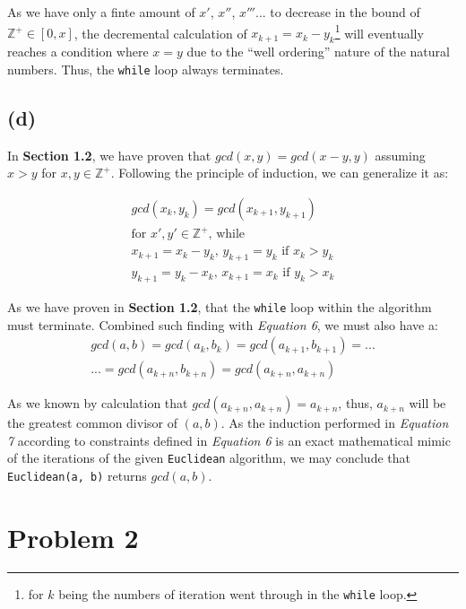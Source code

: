 \documentclass[12pt]{article}
\newcommand{\inlinecode}{\texttt}
\begin{document}
As we have only a finte amount of $x'$, $x''$, $x'''$... to decrease in the bound of $\mathbb{Z^+} \in [0, x]$, the decremental calculation of $x_{k+1} = x_{k} - y_{k}$\footnote{for $k$ being the numbers of iteration went through in the \inlinecode{while} loop.} will eventually reaches a condition where $x = y$ due to the ``well ordering'' nature of the natural numbers. Thus, the \inlinecode{while} loop always terminates.

\subsection{(d)}

In \textbf{Section 1.2}, we have proven that $gcd(x, y) = gcd(x-y, y)$ assuming $x > y$ for $x, y \in \mathbb{Z^+}$. Following the principle of induction, we can generalize it as:

\begin{gather}
    gcd(x_k, y_k) = gcd(x_{k+1}, y_{k+1}) \\
    \text{for $x', y' \in \mathbb{Z^+}$,  while } \nonumber \\
    \text{$x_{k+1} = x_{k} - y_{k}$, $y_{k+1} = y_{k}$ \ \ \  if $x_{k} > y_{k}$} \nonumber \\
    \text{$y_{k+1} = y_{k} - x_{k}$, $x_{k+1} = x_{k}$ \ \ \  if $y_{k} > x_{k}$} \nonumber
\end{gather}



As we have proven in \textbf{Section 1.2}, that the \inlinecode{while} loop within the algorithm must terminate. Combined such finding with \textit{Equation 6}, we must also have a:
\begin{gather}
    gcd(a, b) = gcd(a_{k}, b_{k}) = gcd(a_{k+1}, b_{k+1}) = ... \\ ... = gcd(a_{k+n}, b_{k+n}) = gcd(a_{k+n}, a_{k+n}) \nonumber
\end{gather}

As we known by calculation that $gcd(a_{k+n}, a_{k+n}) = a_{k+n}$, thus, $a_{k+n}$ will be the greatest common divisor of $(a, b)$. As the induction performed in \textit{Equation 7} according to constraints defined in \textit{Equation 6} is an exact mathematical mimic of the iterations of the given \inlinecode{Euclidean} algorithm, we may conclude that \inlinecode{Euclidean(a, b)} returns $gcd(a, b)$.

\section{Problem 2}
\end{document}
